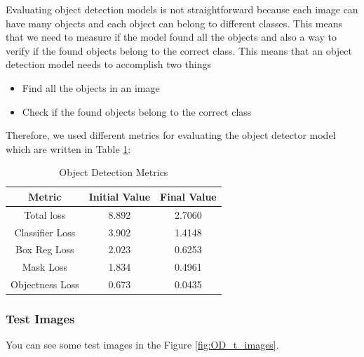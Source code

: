 \documentclass[a4paper, openany]{book}
\begin{document}
Evaluating object detection models is not straightforward because each image can have many objects and each object can belong to different classes. This means that we need to measure if the model found all the objects and also a way to verify if the found objects belong to the correct class. This means that an object detection model needs to accomplish two things

\begin{itemize}
\item Find all the objects in an image
\item Check if the found objects belong to the correct class
\end{itemize}

Therefore, we used different metrics for evaluating the object detector model which are written in Table \ref{table:OD_Metrics}:


\begin{table}[htp]
\caption{Object Detection Metrics}
\begin{center}
\begin{tabular}{c | c | c}
Metric & Initial Value & Final Value\\
\hline
Total loss &8.892 & 2.7060\\
Classifier Loss & 3.902 & 1.4148\\
Box Reg Loss& 2.023 & 0.6253\\
Mask Loss & 1.834 & 0.4961\\
Objectness Loss& 0.673 & 0.0435
\end{tabular}
\end{center}
\label{table:OD_Metrics}
\end{table}%


\newpage

\subsubsection{Test Images}
	\vspace{0.3cm}
	
You can see some test images in the Figure \ref{fig:OD_t_images}.
\end{document}

